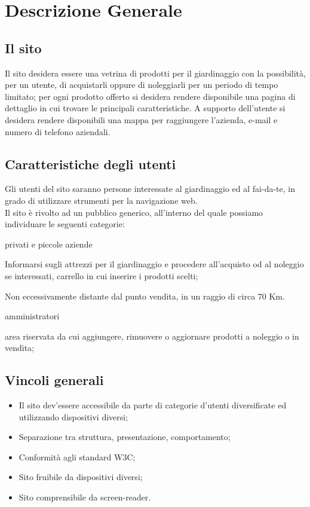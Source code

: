 \section{Descrizione Generale}{
	\subsection{Il sito}{
		Il sito desidera essere una vetrina di prodotti per il giardinaggio con la possibilità, per un utente, di acquistarli oppure di noleggiarli per un periodo di tempo limitato; per ogni prodotto offerto si desidera rendere disponibile una pagina di dettaglio in cui trovare le principali caratteristiche.
		A supporto dell'utente si desidera rendere disponibili una mappa per raggiungere l'azienda, e-mail e numero di telefono aziendali.
	}
	\subsection{Caratteristiche degli utenti}{
		Gli utenti del sito saranno persone interessate al giardinaggio ed al fai-da-te, in grado di utilizzare strumenti per la navigazione web. \\
		Il sito è rivolto ad un pubblico generico, all'interno del quale possiamo individuare le seguenti categorie:
		\begin{description}\itemsep1pt
			\item[Categoria di utenti:] privati e piccole aziende
			\begin{description}\itemsep1pt
				\item[Funzionalità:] Informarsi sugli attrezzi per il giardinaggio e procedere all'acquisto od al noleggio se interessati, carrello in cui inserire i prodotti scelti; 
				\item[Termini generali:] Non eccessivamente distante dal punto vendita, in un raggio di circa 70 Km.
			\end{description}
			\item[Categoria di utenti:] amministratori
			\begin{description}\itemsep1pt
				\item[Funzionalità:] area riservata da cui aggiungere, rimuovere o aggiornare prodotti a noleggio o in vendita;
			\end{description}
		\end{description}
	}
	\subsection{Vincoli generali}{
		\begin{itemize}\itemsep1pt
			\item Il sito dev'essere accessibile da parte di categorie d'utenti diversificate ed utilizzando dispositivi diversi;
			\item Separazione tra struttura, presentazione, comportamento;
			\item Conformità agli standard W3C;
			\item Sito fruibile da dispositivi diversi;
			\item Sito comprensibile da screen-reader.
		\end{itemize}
	}
}
